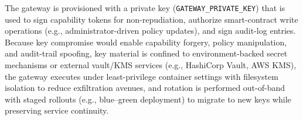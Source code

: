\documentclass[final,5p,times,twocolumn]{elsarticle}
\begin{document}





The gateway is provisioned with a private key (\texttt{GATEWAY\_PRIVATE\_KEY}) that is used to sign capability tokens for non-repudiation, authorize smart-contract write operations (e.g., administrator-driven policy updates), and sign audit-log entries. Because key compromise would enable capability forgery, policy manipulation, and audit-trail spoofing, key material is confined to environment-backed secret mechanisms or external vault/KMS services (e.g., HashiCorp Vault, AWS KMS), the gateway executes under least-privilege container settings with filesystem isolation to reduce exfiltration avenues, and rotation is performed out-of-band with staged rollouts (e.g., blue--green deployment) to migrate to new keys while preserving service continuity.



\end{document}
